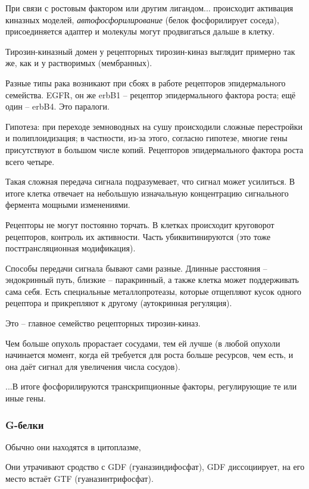 \documentclass[main.tex]{subfiles}
\begin{document}
При связи с ростовым фактором или другим лигандом... происходит активация киназных моделей, \emph{автофосфорилирование} (белок фосфорилирует соседа), присоединяется адаптер и молекулы могут продвигаться дальше в клетку.

Тирозин-киназный домен у рецепторных тирозин-киназ выглядит примерно так же, как и у растворимых (мембранных). %

Разные типы рака возникают при сбоях в работе рецепторов эпидермального семейства.
EGFR, он же erbB1 -- рецептор эпидермального фактора роста; ещё один -- erbB4.
Это паралоги.

Гипотеза: при переходе земноводных на сушу происходили сложные перестройки и полиплоидизация; в частности, из-за этого, согласно гипотезе, многие гены присутствуют в большом числе копий.
Рецепторов эпидермального фактора роста всего четыре.

Такая сложная передача сигнала подразумевает, что сигнал может усилиться.
В итоге клетка отвечает на небольшую изначальную концентрацию сигнального фермента мощными изменениями.

Рецепторы не могут постоянно торчать.
В клетках происходит круговорот рецепторов, контроль их активности.
Часть убиквитинируются (это тоже посттрансляционная модификация). %

Способы передачи сигнала бывают сами разные.
Длинные расстояния -- эндокринный путь, близкие -- паракринный, а также клетка может поддерживать сама себя.
Есть специальные металлопротеазы, которые отщепляют кусок одного рецептора и прикрепляют к другому (аутокринная регуляция).

Это -- главное семейство рецепторных тирозин-киназ.

Чем больше опухоль прорастает сосудами, тем ей лучше (в любой опухоли начинается момент, когда ей требуется для роста больше ресурсов, чем есть, и она даёт сигнал для увеличения числа сосудов).


...В итоге фосфорилируются транскрипционные факторы, регулирующие те или иные гены.

\subsubsection{G-белки}

Обычно они находятся в цитоплазме,  %

Они утрачивают сродство с GDF (гуаназиндифосфат), GDF диссоциирует, на его место встаёт  GTF (гуаназинтрифосфат).
\end{document}
